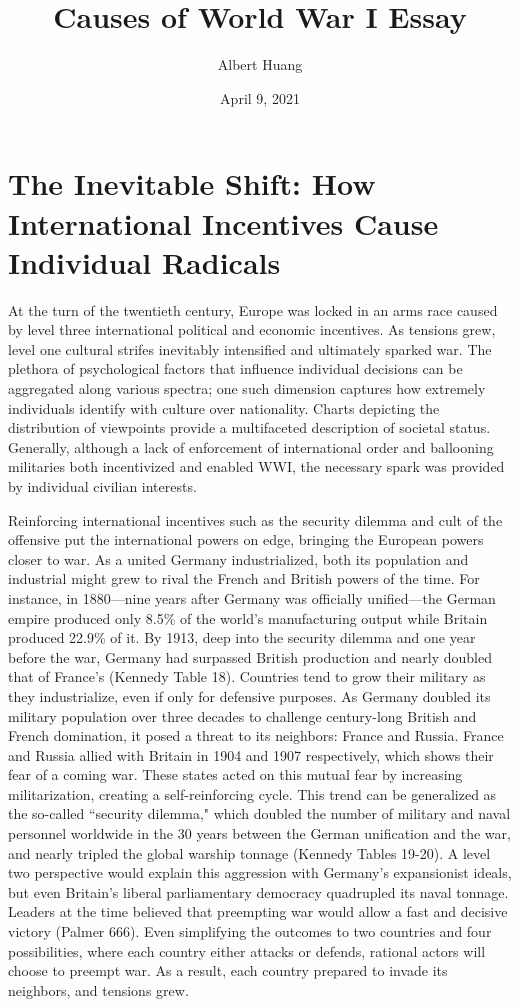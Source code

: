 \documentclass[letterpaper]{article}
\author{Albert Huang}
\date{April 9, 2021}
\title{Causes of World War I Essay}
\renewcommand\maketitle{}
\begin{document}
\maketitle
\setlength\parindent{0.5in}

\section{The Inevitable Shift: How International Incentives Cause Individual Radicals}
\label{sec:orgbdb98f6}

At the turn of the twentieth century, Europe was locked in an arms race caused by level three international political and economic incentives. As tensions grew, level one cultural strifes inevitably intensified and ultimately sparked war.
The plethora of psychological factors that influence individual decisions can be aggregated along various spectra; one such dimension captures how extremely individuals identify with culture over nationality. Charts depicting the distribution of viewpoints provide a multifaceted description of societal status.
Generally, although a lack of enforcement of international order and ballooning militaries both incentivized and enabled WWI, the necessary spark was provided by individual civilian interests.

Reinforcing international incentives such as the security dilemma and cult of the offensive put the international powers on edge, bringing the European powers closer to war.
As a united Germany industrialized, both its population and industrial might grew to rival the French and British powers of the time. For instance, in 1880—nine years after Germany was officially unified—the German empire produced only 8.5\% of the world's manufacturing output while Britain produced 22.9\% of it. By 1913, deep into the security dilemma and one year before the war, Germany had surpassed British production and nearly doubled that of France's (Kennedy Table 18).
Countries tend to grow their military as they industrialize, even if only for defensive purposes. As Germany doubled its military population over three decades to challenge century-long British and French domination, it posed a threat to its neighbors: France and Russia. France and Russia allied with Britain in 1904 and 1907 respectively, which shows their fear of a coming war. These states acted on this mutual fear by increasing militarization, creating a self-reinforcing cycle.
This trend can be generalized as the so-called ``security dilemma," which doubled the number of military and naval personnel worldwide in the 30 years between the German unification and the war, and nearly tripled the global warship tonnage (Kennedy Tables 19-20). A level two perspective would explain this aggression with Germany's expansionist ideals, but even Britain's liberal parliamentary democracy quadrupled its naval tonnage.
Leaders at the time believed that preempting war would allow a fast and decisive victory (Palmer 666). Even simplifying the outcomes to two countries and four possibilities, where each country either attacks or defends, rational actors will choose to preempt war. As a result, each country prepared to invade its neighbors, and tensions grew.
\end{document}
